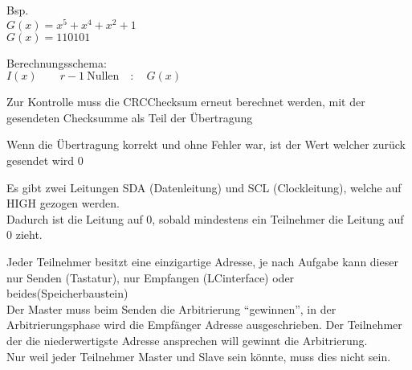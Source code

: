 \documentclass[letterpaper,10pt,english]{jupyterBook}
\begin{document}
\sphinxAtStartPar
Bsp.\\
\(G(x) = x^5 + x^4 + x^2 + 1\)\\
\(G(x) = 110101\)

\sphinxAtStartPar
Berechnungsschema:\\
\(I(x)\qquad r-1~\text{Nullen}\quad:\quad G(x)\)

\begin{DUlineblock}{0em}
\item[] 
\end{DUlineblock}

\sphinxAtStartPar
{}

\begin{DUlineblock}{0em}
\item[] 
\end{DUlineblock}

\sphinxAtStartPar
Zur Kontrolle muss die CRC\sphinxhyphen{}Checksum erneut berechnet werden,
mit der gesendeten Checksumme als Teil der Übertragung

\sphinxAtStartPar
Wenn die Übertragung korrekt und ohne Fehler war,
ist der Wert welcher zurück gesendet wird 0

\sphinxAtStartPar
{}

\begin{DUlineblock}{0em}
\item[] 
\end{DUlineblock}

\sphinxAtStartPar
{}

\begin{DUlineblock}{0em}
\item[] 
\end{DUlineblock}

\begin{DUlineblock}{0em}
\item[] 
\end{DUlineblock}

\sphinxAtStartPar
Es gibt zwei Leitungen SDA (Datenleitung) und SCL (Clockleitung),
welche auf HIGH gezogen werden.\\
Dadurch ist die Leitung auf 0,
sobald mindestens ein Teilnehmer die Leitung auf 0 zieht.

\sphinxAtStartPar
Jeder Teilnehmer besitzt eine einzigartige Adresse,
je nach Aufgabe kann dieser nur Senden (Tastatur),
nur Empfangen (LC\sphinxhyphen{}interface) oder beides(Speicherbaustein)\\
Der Master muss beim Senden die Arbitrierung “gewinnen”,
in der Arbitrierungsphase wird die Empfänger Adresse ausgeschrieben.
Der Teilnehmer der die niederwertigste Adresse ansprechen will gewinnt die Arbitrierung.\\
Nur weil jeder Teilnehmer Master und Slave sein könnte,
muss dies nicht sein.
\end{document}
